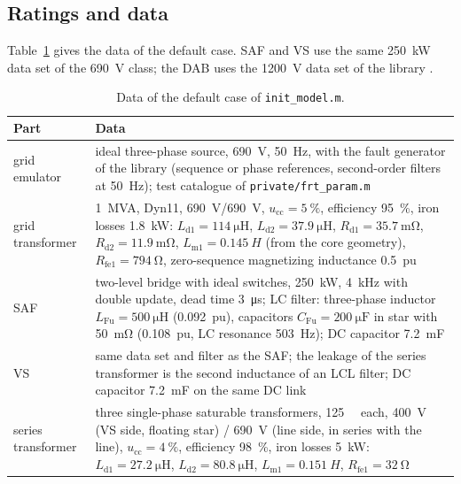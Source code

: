 \documentclass[11pt,a4paper]{scrartcl}
\newcommand{\ped}[1]{_{\mathrm{#1}}}
\newcommand{\code}[1]{\texttt{#1}}
\begin{document}
\begin{onehalfspace}
\subsection{Ratings and data}

Table~\ref{tab:data} gives the data of the default case. SAF and VS use the same \SI{250}{\kilo\watt} data set of the \SI{690}{V} class; the DAB uses the \SI{1200}{V} data set of the library \cite{library}.

\begin{table}[H]
	\centering
	\captionsetup{width=0.9\textwidth, font=small}
	\caption{Data of the default case of \code{init\_model.m}.}
	\label{tab:data}
	\footnotesize
	\begin{tabularx}{0.97\textwidth}{@{} >{\raggedright\arraybackslash}p{} X @{}}
		\toprule
		\textbf{Part} & \textbf{Data} \\
		\midrule
		grid emulator & ideal three-phase source, \SI{690}{V}, \SI{50}{Hz}, with the fault generator of the library (sequence or phase references, second-order filters at \SI{50}{Hz}); test catalogue of \code{private/frt\_param.m} \\
		grid transformer & \SI{1}{MVA}, Dyn11, \SI{690}{V}/\SI{690}{V}, $u\ped{cc} = \SI{5}{\percent}$, efficiency \SI{95}{\percent}, iron losses \SI{1.8}{\kilo\watt}: $L\ped{d1} = \SI{114}{\micro\henry}$, $L\ped{d2} = \SI{37.9}{\micro\henry}$, $R\ped{d1} = \SI{35.7}{\milli\ohm}$, $R\ped{d2} = \SI{11.9}{\milli\ohm}$, $L\ped{m1} = \SI{0.145}{H}$ (from the core geometry), $R\ped{fe1} = \SI{794}{\ohm}$, zero-sequence magnetizing inductance \SI{0.5}{pu} \\
		SAF & two-level bridge with ideal switches, \SI{250}{\kilo\watt}, \SI{4}{kHz} with double update, dead time \SI{3}{\micro\second}; LC filter: three-phase inductor $L\ped{Fu} = \SI{500}{\micro\henry}$ (\SI{0.092}{pu}), capacitors $C\ped{Fu} = \SI{200}{\micro\farad}$ in star with \SI{50}{\milli\ohm} (\SI{0.108}{pu}, LC resonance \SI{503}{Hz}); DC capacitor \SI{7.2}{mF} \\
		VS & same data set and filter as the SAF; the leakage of the series transformer is the second inductance of an LCL filter; DC capacitor \SI{7.2}{mF} on the same DC link \\
		series transformer & three single-phase saturable transformers, \SI{125}{\kilo\VA} each, \SI{400}{V} (VS side, floating star) / \SI{690}{V} (line side, in series with the line), $u\ped{cc} = \SI{4}{\percent}$, efficiency \SI{98}{\percent}, iron losses \SI{5}{\kilo\watt}: $L\ped{d1} = \SI{27.2}{\micro\henry}$, $L\ped{d2} = \SI{80.8}{\micro\henry}$, $L\ped{m1} = \SI{0.151}{H}$, $R\ped{fe1} = \SI{32}{\ohm}$ \\

\end{tabularx}
\end{table}
\end{onehalfspace}
\end{document}
